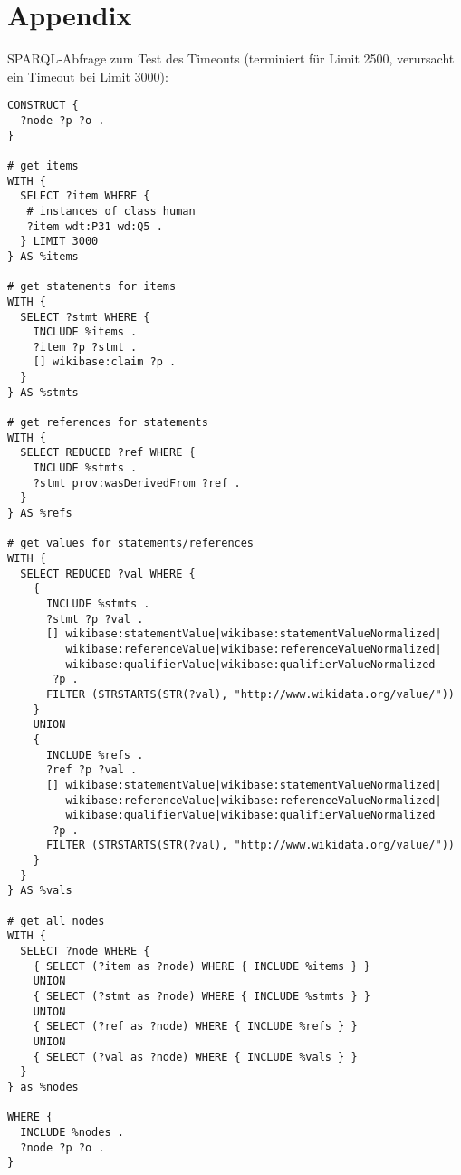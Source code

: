 \chapter{Appendix}

SPARQL-Abfrage zum Test des Timeouts (terminiert für Limit 2500, verursacht ein Timeout bei Limit 3000):

\begin{lstlisting}[language=SPARQL, caption={SPARQL-Query für Person-Items (verwendet NamedSubqueries, eine SPARQL-Erweiterung von BlazeGraph)}, label={lst:sparql-persons}]
CONSTRUCT {
  ?node ?p ?o .
}

# get items
WITH {
  SELECT ?item WHERE {
   # instances of class human
   ?item wdt:P31 wd:Q5 . 
  } LIMIT 3000
} AS %items

# get statements for items
WITH {
  SELECT ?stmt WHERE {
    INCLUDE %items .
    ?item ?p ?stmt .
    [] wikibase:claim ?p .
  }
} AS %stmts

# get references for statements
WITH {
  SELECT REDUCED ?ref WHERE {
    INCLUDE %stmts .
    ?stmt prov:wasDerivedFrom ?ref .
  }
} AS %refs 

# get values for statements/references
WITH {
  SELECT REDUCED ?val WHERE {
    {
      INCLUDE %stmts .
      ?stmt ?p ?val .
      [] wikibase:statementValue|wikibase:statementValueNormalized|
         wikibase:referenceValue|wikibase:referenceValueNormalized|
         wikibase:qualifierValue|wikibase:qualifierValueNormalized 
       ?p .
      FILTER (STRSTARTS(STR(?val), "http://www.wikidata.org/value/"))
    }
    UNION
    {
      INCLUDE %refs .
      ?ref ?p ?val .
      [] wikibase:statementValue|wikibase:statementValueNormalized|
         wikibase:referenceValue|wikibase:referenceValueNormalized|
         wikibase:qualifierValue|wikibase:qualifierValueNormalized 
       ?p .
      FILTER (STRSTARTS(STR(?val), "http://www.wikidata.org/value/"))
    }
  }
} AS %vals 

# get all nodes
WITH {
  SELECT ?node WHERE {
    { SELECT (?item as ?node) WHERE { INCLUDE %items } }
    UNION 
    { SELECT (?stmt as ?node) WHERE { INCLUDE %stmts } } 
    UNION
    { SELECT (?ref as ?node) WHERE { INCLUDE %refs } } 
    UNION
    { SELECT (?val as ?node) WHERE { INCLUDE %vals } }
  }
} as %nodes

WHERE {
  INCLUDE %nodes .
  ?node ?p ?o .
}
\end{lstlisting}